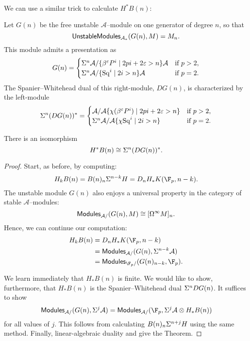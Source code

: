 \noindent We can use a similar trick to calculate $H^* B(n)$:

\begin{definition}\label{SpanierWhiteheadDualOfGeneratingModule}
Let $G(n)$ be the free unstable $\mathcal A$--module on one generator of degree $n$, so that \[\mathsf{UnstableModules}_{\mathcal A_*}(G(n), M) = M_n.\]  This module admits a presentation as \[G(n) = \begin{cases} \Sigma^n \mathcal A / \{\beta^\varepsilon P^i \mid 2pi + 2\varepsilon > n\}\mathcal A & \text{if $p > 2$}, \\ \Sigma^n \mathcal A / \{\operatorname{Sq}^i \mid 2i > n\}\mathcal A & \text{if $p = 2$}. \end{cases}\]  The Spanier--Whitehead dual of this right-module, $DG(n)$, is characterized by the left-module \[\Sigma^n (D G(n))^* = \begin{cases}\mathcal A / \mathcal A \{\chi(\beta^\varepsilon P^i) \mid 2pi + 2\varepsilon > n\} & \text{if $p > 2$}, \\ \Sigma^n \mathcal A / \mathcal A \{\chi{\operatorname{Sq}^i} \mid 2i > n\} & \text{if $p = 2$}. \end{cases}\]
\end{definition}

\begin{theorem}
There is an isomorphism  \[H^* B(n) \cong \Sigma^n(DG(n))^*.\]
\end{theorem}
\begin{proof}
Start, as before, by computing:
\begin{align*}
H_k B(n) = B(n)_n \Susp^{n-k} H = D_n H_* K(\F_p, n-k).
\end{align*}
The unstable module $G(n)$ also enjoys a universal property in the category of stable $\mathcal A$--modules: \[\mathsf{Modules}_{\mathcal A/}(G(n), M) \cong [\Omega^\infty M]_n.\]  Hence, we can continue our computation:
\begin{align*}
H_k B(n) & = D_n H_* K(\F_p, n-k) \\
& = \CatOf{Modules}_{\mathcal A/}(G(n), \Susp^{n-k} \mathcal A) \\
& = \CatOf{Modules}_{\F_p/}(G(n)_{n-k}, \F_p).
\end{align*}

We learn immediately that $H_* B(n)$ is finite.  We would like to show, furthermore, that $H_* B(n)$ is the Spanier--Whitehead dual $\Sigma^n DG(n)$.  It suffices to show \[\CatOf{Modules}_{\mathcal A/}(G(n), \Susp^j \mathcal A) = \CatOf{Modules}_{\mathcal A/}(\F_p, \Susp^j \mathcal A \otimes H_* B(n))\] for all values of $j$.  This follows from calculating $B(n)_n \Sigma^{n+j} H$ using the same method.  Finally, linear-algebraic duality and  give the Theorem.
\end{proof}

